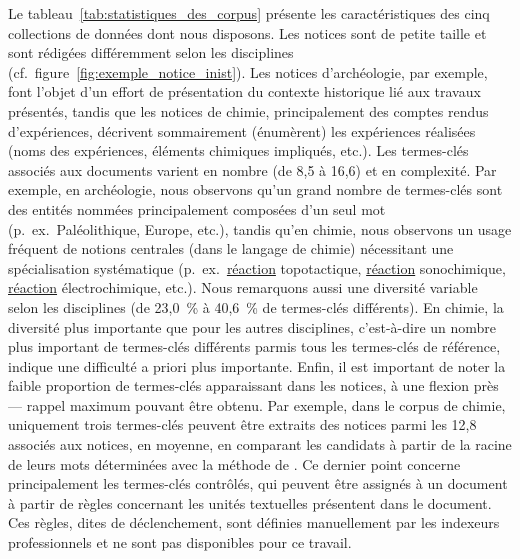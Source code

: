   Le tableau~\ref{tab:statistiques_des_corpus} présente les caractéristiques des
  cinq collections de données dont nous disposons. Les notices sont de petite
  taille et sont rédigées différemment selon les disciplines
  (cf.~figure~\ref{fig:exemple_notice_inist}). Les notices d'archéologie, par
  exemple, font l'objet d'un effort de présentation du contexte historique lié
  aux travaux présentés, tandis que les notices de chimie, principalement des
  comptes rendus d'expériences, décrivent sommairement (énumèrent) les
  expériences réalisées (noms des expériences, éléments chimiques impliqués,
  etc.). Les termes-clés associés aux documents varient en nombre (de 8,5 à
  16,6) et en complexité. Par exemple, en archéologie, nous observons qu'un
  grand nombre de termes-clés sont des entités nommées principalement composées
  d'un seul mot (p.~ex.~\og{}Paléolithique\fg{}, \og{}Europe\fg{}, etc.), tandis
  qu'en chimie, nous observons un usage fréquent de notions centrales (dans le
  langage de chimie) nécessitant une spécialisation systématique
  (p.~ex.~\og{}\underline{réaction} topotactique\fg{}, \og{}\underline{réaction}
  sonochimique\fg{}, \og{}\underline{réaction} électrochimique\fg{}, etc.).
  Nous remarquons aussi une diversité variable selon les disciplines (de 23,0~\%
  à 40,6~\% de termes-clés différents). En chimie, la diversité plus importante
  que pour les autres disciplines, c'est-à-dire un nombre plus important de
  termes-clés différents parmis tous les termes-clés de référence, indique une difficulté a priori plus
  importante. Enfin, il est important de noter la faible proportion de
  termes-clés apparaissant dans les notices, à une flexion près --- rappel maximum pouvant être
  obtenu. Par exemple, dans le corpus de chimie, uniquement trois termes-clés
  peuvent être extraits des notices parmi les 12,8 associés aux notices, en
  moyenne, en comparant les candidats à partir de la racine de leurs mots
  déterminées avec la méthode de . Ce dernier point concerne principalement les termes-clés contrôlés,
  qui peuvent être assignés à un document à partir de règles concernant les
  unités textuelles présentent dans le document. Ces règles, dites de
  déclenchement, sont définies manuellement par les indexeurs professionnels et
  ne sont pas disponibles pour ce travail.
